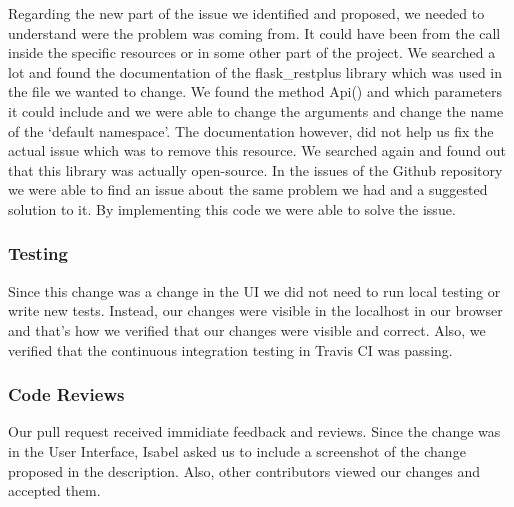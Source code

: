 \documentclass{article}
\begin{document}
Regarding the new part of the issue we identified and proposed, we needed to understand were the problem was coming from. It could have been from the call inside the specific resources or in some other part of the project. We searched a lot and found the documentation of the flask\_restplus library which was used in the file we wanted to change. We found the method Api() and which parameters it could include and we were able to change the arguments and change the name of the `default namespace'. The documentation however, did not help us fix the actual issue which was to remove this resource. We searched again and found out that this library was actually open-source. In the issues of the Github repository we were able to find an issue about the same problem we had and a suggested solution to it. By implementing this code we were able to solve the issue.
\subsubsection{Testing}
\hspace{0.5cm}Since this change was a change in the UI we did not need to run local testing or write new tests. Instead, our changes were visible in the localhost in our browser and that's how we verified that our changes were visible and correct. Also, we verified that the continuous integration testing in Travis CI was passing. 
\subsubsection{Code Reviews}
\hspace{0.5cm}Our pull request received immidiate feedback and reviews. Since the change was in the User Interface, Isabel asked us to include a screenshot of the change proposed in the description. Also, other contributors viewed our changes and accepted them. 
\end{document}

